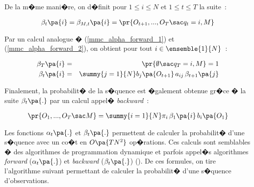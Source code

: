         






De la m�me mani�re, on d�finit pour $1\leqslant i\leqslant N$ et $1\leqslant t\leqslant T$ la suite~:


        \begin{eqnarray}
        \beta_{t}\pa{i}  = \beta_{M,t}\pa{i}  = \pr{   O_{t+1} ,...,O_{T} \sac q_{t}=i,M} \label{hmm_eq_beta_1}
        \end{eqnarray}

Par un calcul analogue � (\ref{mmc_alpha_forward_1}) et (\ref{mmc_alpha_forward_2}), on obtient pour tout $i \in \ensemble{1}{N}$~:

        \begin{eqnarray}
        \beta_{T}\pa{i}  &=& \pr{   \emptyset \sac q_{T}=i,M } = 1 \label{hmm_eq_beta_2}\\
        \beta_{t}\pa{i}  &=& \summy{j=1}{N} b_{j} \pa{O_{t+1}}\,a_{ij}\,\beta_{t+1}\pa{j} \label{hmm_eq_beta_3}
        \end{eqnarray}

Finalement, la probabilit� de la s�quence est �galement obtenue gr�ce � la suite $\beta_t\pa{.}$ par un calcul appel� \emph{backward}~:


        \begin{eqnarray}
        \pr { O_{1},...,O_{T} \sac  M }  = \summy{i=1}{N} \pi_{i}\,\beta_{1} \pa{i} \,b_{i}\pa{O_{1}} \label{hmm_eq_beta_4}
        \end{eqnarray}


Les fonctions $\alpha_t\pa{.}$ et $\beta_t\pa{.}$ permettent de calculer la probabilit� d'une s�quence avec un co�t en $O\pa{TN^2}$ op�rations. Ces calculs sont semblables � des algorithmes de programmation dynamique et parfois appel�s algorithmes \emph{forward} ($\alpha_t\pa{.}$) et \emph{backward} ($\beta_t\pa{.}$) (). De ces formules, on tire l'algorithme suivant permettant de calculer la probabilit� d'une s�quence d'observations.


